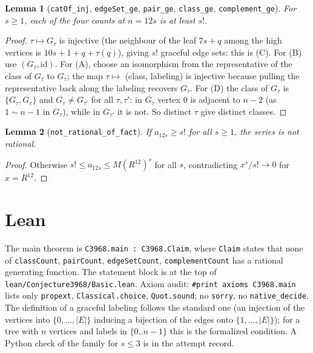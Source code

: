 \documentclass[11pt]{article}
\newtheorem{lemma}{Lemma}
\begin{document}
\begin{lemma}[\texttt{catOf\_inj}, \texttt{edgeSet\_ge}, \texttt{pair\_ge}, \texttt{class\_ge}, \texttt{complement\_ge}]
For $s\ge1$, each of the four counts at $n=12s$ is at least $s!$.
\end{lemma}
\begin{proof}
$\tau\mapsto G_\tau$ is injective (the neighbour of the leaf $7s+q$ among the high vertices is $10s+1+q+\tau(q)$), giving $s!$ graceful edge sets: this is (C). For (B) use $(G_\tau,\mathrm{id})$. For (A), choose an isomorphism from the representative of the class of $G_\tau$ to $G_\tau$; the map $\tau\mapsto$ (class, labeling) is injective because pulling the representative back along the labeling recovers $G_\tau$. For (D) the class of $G_\tau$ is $\{G_\tau,\overline{G_\tau}\}$ and $\overline{G_\tau}\ne G_{\tau'}$ for all $\tau,\tau'$: in $\overline{G_\tau}$ vertex $0$ is adjacent to $n-2$ (as $1\sim n-1$ in $G_\tau$), while in $G_{\tau'}$ it is not. So distinct $\tau$ give distinct classes.
\end{proof}

\begin{lemma}[\texttt{not\_rational\_of\_fact}]
If $a_{12s}\ge s!$ for all $s\ge1$, the series is not rational.
\end{lemma}
\begin{proof}
Otherwise $s!\le a_{12s}\le M(R^{12})^s$ for all $s$, contradicting $x^s/s!\to0$ for $x=R^{12}$.
\end{proof}

\section*{Lean}
The main theorem is \texttt{C3968.main : C3968.Claim}, where \texttt{Claim} states that none of \texttt{classCount}, \texttt{pairCount}, \texttt{edgeSetCount}, \texttt{complementCount} has a rational generating function. The statement block is at the top of \texttt{lean/Conjecture3968/Basic.lean}. Axiom audit: \texttt{\#print axioms C3968.main} lists only \texttt{propext}, \texttt{Classical.choice}, \texttt{Quot.sound}; no \texttt{sorry}, no \texttt{native\_decide}. The definition of a graceful labeling follows the standard one (an injection of the vertices into $\{0,\dots,|E|\}$ inducing a bijection of the edges onto $\{1,\dots,|E|\}$); for a tree with $n$ vertices and labels in $\{0..n-1\}$ this is the formalized condition. A Python check of the family for $s\le3$ is in the attempt record.
\end{document}
